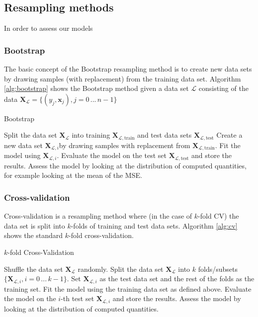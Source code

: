 \documentclass{article}
\newcommand{\XX}{\mathbf{X}}
\begin{document}
\subsection{Resampling methods}
In order to assess our models
\subsubsection{Bootstrap}
The basic concept of the Bootstrap resampling method is to create new data sets by drawing samples (with replacement) from the training data set. Algorithm \ref{alg:bootstrap} shows the Bootstrap method given a data set $\mathcal{L}$ consisting of the data $\XX_{\mathcal{L}} = \{(y_j, \bm{x}_j), j= 0 \,...\, n-1\}$
\begin{algorithm}[H]
\caption{Bootstrap}
\begin{algorithmic}[1]
\State Split the data set $\XX_{\mathcal{L}}$ into training $\XX_{\mathcal{L},\text{train}}$ and test data sets $\XX_{\mathcal{L},\text{test}}$
\State Create a new data set $\XX_{\mathcal{L},i}$by drawing samples with replacement from  $\XX_{\mathcal{L},\text{train}}$.
\State Fit the model using $\XX_{\mathcal{L},i}$.
\State Evaluate the model on the test set $\XX_{\mathcal{L},\text{test}}$ and store the results.
\EndFor
\State Assess the model by looking at the distribution of computed quantities, for example looking at the mean of the MSE.
\end{algorithmic}
\label{alg:bootstrap}
\end{algorithm}

\subsubsection{Cross-validation}
Cross-validation is a resampling method where (in the case of $k$-fold CV) the data set is split into $k$-folds of training and test data sets. Algorithm \ref{alg:cv} shows the standard $k$-fold cross-validation.
\begin{algorithm}[H]
\caption{$k$-fold Cross-Validation}
\begin{algorithmic}[1]
\State Shuffle the data set $\XX_{\mathcal{L}}$ randomly.
\State Split the data set $\XX_{\mathcal{L}}$ into $k$ folds/subsets $\{\XX_{\mathcal{L},i}, i=0\,...\,k-1\}$.
\State Set $\XX_{\mathcal{L},i}$ as the test data set and the rest of the folds as the training set.
\State Fit the model using the training data set as defined above.
\State Evaluate the model on the $i$-th test set $\XX_{\mathcal{L},i}$ and store the results.
\EndFor
\State Assess the model by looking at the distribution of computed quantities.%
\end{algorithmic}
\label{alg:cv}
\end{algorithm}
\end{document}
